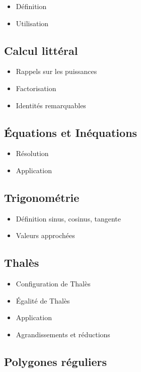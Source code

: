 \begin{itemize}
	\item Définition
	\item Utilisation
\end{itemize}

\subsection{Calcul littéral}

\begin{itemize}
	\item Rappels sur les puissances
	\item Factorisation
	\item Identités remarquables
\end{itemize}

\subsection{\'Equations et Inéquations}

\begin{itemize}
	\item Résolution
	\item Application
\end{itemize}

\subsection{Trigonométrie}

\begin{itemize}
	\item Définition sinus, cosinus, tangente
	\item Valeurs approchées
\end{itemize}

\subsection{Thalès}

\begin{itemize}
	\item Configuration de Thalès
	\item \'Egalité de Thalès
	\item Application
	\item Agrandissements et réductions
	
\end{itemize}

\subsection{Polygones réguliers}

